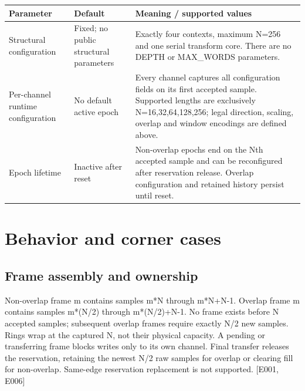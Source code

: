 \documentclass[11pt,a4paper]{article}
\begin{document}
{\small\renewcommand{\arraystretch}{1.18}\begin{longtable}{@{}L{0.22\textwidth}|L{0.21\textwidth}|L{0.49\textwidth}@{}}\toprule

\textbf{Parameter} & \textbf{Default} & \textbf{Meaning /\allowbreak{} supported values}\\\midrule\endhead

Structural configuration & Fixed; no public structural parameters & Exactly four contexts,\allowbreak{} maximum N=\allowbreak{}256 and one serial transform core. There are no DEPTH or MAX\_\allowbreak{}WORDS parameters.\\[2pt]\hline

Per-channel runtime configuration & No default active epoch & Every channel captures all configuration fields on its first accepted sample. Supported lengths are exclusively N=\allowbreak{}16,\allowbreak{}32,\allowbreak{}64,\allowbreak{}128,\allowbreak{}256; legal direction,\allowbreak{} scaling,\allowbreak{} overlap and window encodings are defined above.\\[2pt]\hline

Epoch lifetime & Inactive after reset & Non-overlap epochs end on the Nth accepted sample and can be reconfigured after reservation release. Overlap configuration and retained history persist until reset.\\[2pt]\hline

\bottomrule\end{longtable}}

\section{Behavior and corner cases}

\subsection{Frame assembly and ownership}

Non-overlap frame m contains samples m*\allowbreak{}N through m*\allowbreak{}N+\allowbreak{}N-1. Overlap frame m contains samples m*\allowbreak{}(\allowbreak{}N/\allowbreak{}2)\allowbreak{} through m*\allowbreak{}(\allowbreak{}N/\allowbreak{}2)\allowbreak{}+\allowbreak{}N-1. No frame exists before N accepted samples; subsequent overlap frames require exactly N/\allowbreak{}2 new samples. Rings wrap at the captured N,\allowbreak{} not their physical capacity. A pending or transferring frame blocks writes only to its own channel. Final transfer releases the reservation,\allowbreak{} retaining the newest N/\allowbreak{}2 raw samples for overlap or clearing fill for non-overlap. Same-edge reservation replacement is not supported. [\allowbreak{}E001,\allowbreak{} E006]\allowbreak{}
\end{document}
